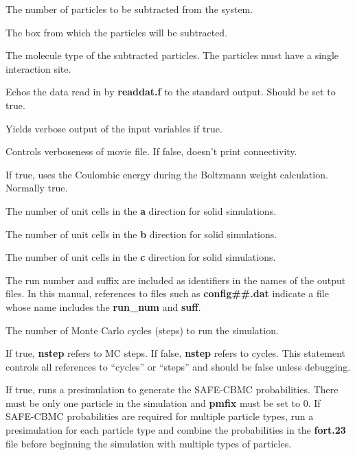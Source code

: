 \documentclass[12pt,letterpaper]{article}
\begin{document}
 The number of particles to be subtracted from the system.

  The box from which the particles will be subtracted.

 The molecule type of the subtracted particles.
The particles must have a single interaction site.

 Echos the data read in by {\textbf {readdat.f}} to the
standard output. Should be set to true.

 Yields verbose output of the input variables if true.

 Controls verboseness of movie file. If false, doesn't print connectivity.

 If true, uses the Coulombic energy during the Boltzmann weight calculation.
Normally true.

 The number of unit cells in the {\bf a} direction for solid simulations.

 The number of unit cells in the {\bf b} direction for solid simulations.

 The number of unit cells in the {\bf c} direction for solid simulations.

 The run number and suffix are included as identifiers in the names of the output files.
In this manual, references to files such as {\bf config\#\#.dat} indicate a file whose name includes the {\bf run\_num} and {\bf suff}.

 The number of Monte Carlo cycles (steps) to run the simulation.

 If true, {\textbf{nstep}} refers to MC steps.  If false, {\textbf{nstep}} refers to cycles.  
This statement controls all references to ``cycles'' or ``steps'' and should be false unless debugging.

 If true, runs a presimulation to generate the SAFE-CBMC probabilities.  
There must be only one particle in the simulation and {\textbf {pmfix}} must be set to 0.  If SAFE-CBMC
probabilities are required for multiple particle types, run a presimulation for each particle type and 
combine the probabilities in the {\textbf{fort.23}} file before beginning the simulation with multiple types of particles.
\end{document}

